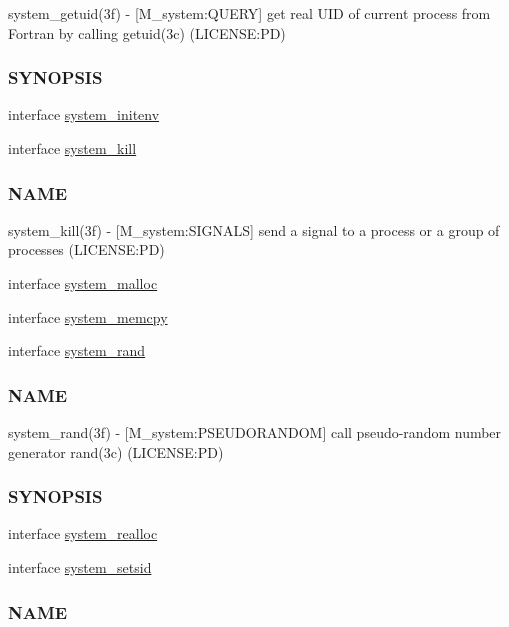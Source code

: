 \begin{DoxyCompactItemize}
\begin{DoxyCompactList}
system\+\_\+getuid(3f) -\/ \mbox{[}M\+\_\+system\+:Q\+U\+E\+RY\mbox{]} get real U\+ID of current process from Fortran by calling getuid(3c) (L\+I\+C\+E\+N\+SE\+:PD) \subsubsection*{S\+Y\+N\+O\+P\+S\+IS}\end{DoxyCompactList}\item 
interface \mbox{\hyperlink{interfacem__system_1_1system__initenv}{system\+\_\+initenv}}
\item 
interface \mbox{\hyperlink{interfacem__system_1_1system__kill}{system\+\_\+kill}}
\begin{DoxyCompactList}\small\item\em \subsubsection*{N\+A\+ME}

system\+\_\+kill(3f) -\/ \mbox{[}M\+\_\+system\+:S\+I\+G\+N\+A\+LS\mbox{]} send a signal to a process or a group of processes (L\+I\+C\+E\+N\+SE\+:PD) \end{DoxyCompactList}\item 
interface \mbox{\hyperlink{interfacem__system_1_1system__malloc}{system\+\_\+malloc}}
\item 
interface \mbox{\hyperlink{interfacem__system_1_1system__memcpy}{system\+\_\+memcpy}}
\item 
interface \mbox{\hyperlink{interfacem__system_1_1system__rand}{system\+\_\+rand}}
\begin{DoxyCompactList}\small\item\em \subsubsection*{N\+A\+ME}

system\+\_\+rand(3f) -\/ \mbox{[}M\+\_\+system\+:P\+S\+E\+U\+D\+O\+R\+A\+N\+D\+OM\mbox{]} call pseudo-\/random number generator rand(3c) (L\+I\+C\+E\+N\+SE\+:PD) \subsubsection*{S\+Y\+N\+O\+P\+S\+IS}\end{DoxyCompactList}\item 
interface \mbox{\hyperlink{interfacem__system_1_1system__realloc}{system\+\_\+realloc}}
\item 
interface \mbox{\hyperlink{interfacem__system_1_1system__setsid}{system\+\_\+setsid}}
\begin{DoxyCompactList}\small\item\em \subsubsection*{N\+A\+ME}


\end{DoxyCompactList}
\end{DoxyCompactItemize}
